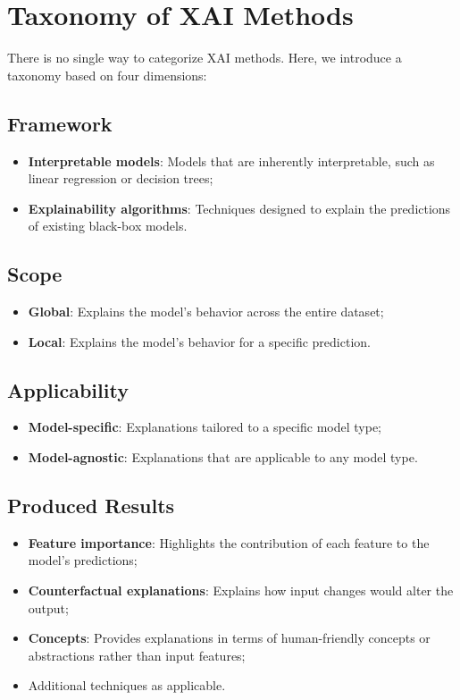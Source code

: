 \section{Taxonomy of XAI Methods}

There is no single way to categorize XAI methods. Here, we introduce a taxonomy
based on four dimensions:

\subsection{Framework}
\begin{itemize}
    \item \textbf{Interpretable models}: Models that are inherently interpretable,
          such as linear regression or decision trees;
    \item \textbf{Explainability algorithms}: Techniques designed to explain the
          predictions of existing black-box models.
\end{itemize}

\subsection{Scope}
\begin{itemize}
    \item \textbf{Global}: Explains the model's behavior across the entire dataset;
    \item \textbf{Local}: Explains the model's behavior for a specific prediction.
\end{itemize}

\subsection{Applicability}
\begin{itemize}
    \item \textbf{Model-specific}: Explanations tailored to a specific model type;
    \item \textbf{Model-agnostic}: Explanations that are applicable to any model type.
\end{itemize}

\subsection{Produced Results}
\begin{itemize}
    \item \textbf{Feature importance}: Highlights the contribution of each feature
          to the model's predictions;
    \item \textbf{Counterfactual explanations}: Explains how input changes would
          alter the output;
    \item \textbf{Concepts}: Provides explanations in terms of human-friendly
          concepts or abstractions rather than input features;
    \item Additional techniques as applicable.
\end{itemize}

